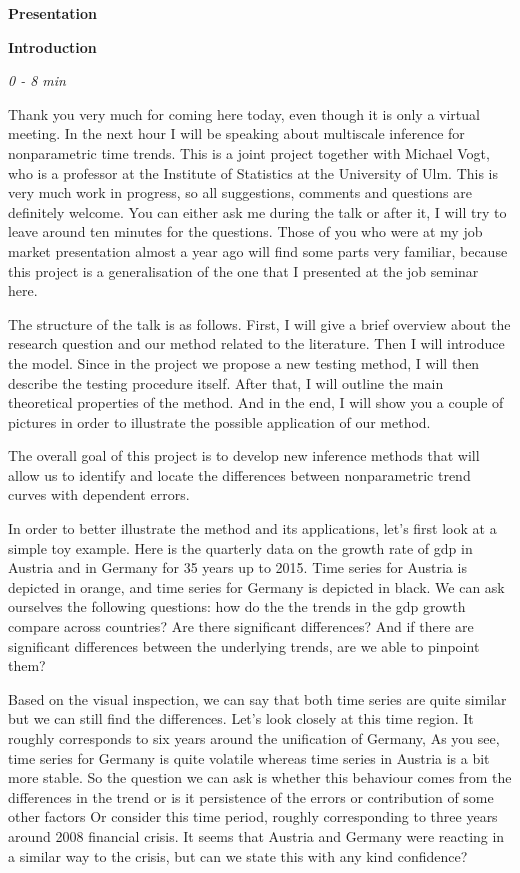 \documentclass[a4paper,12pt]{article}
\begin{document}
\begin{center}
\Large{\textbf{Presentation}}
\end{center}
\textbf{Introduction}

\emph{0 - 8 min}

Thank you very much for coming here today, even though it is only a virtual meeting. In the next hour I will be speaking about multiscale inference for nonparametric time trends. This is a joint project together with Michael Vogt, who is a professor at the Institute of Statistics at the University of Ulm. This is very much work in progress, so all suggestions, comments and questions are definitely welcome. You can either ask me during the talk or after it, I will try to leave around ten minutes for the questions. Those of you who were at my job market presentation almost a year ago will find some parts very familiar, because this project is a generalisation of the one that I presented at the job seminar here.

The structure of the talk is as follows. First, I will give a brief overview about the research question and our method related to the literature. Then I will introduce the model. Since in the project we propose a new testing method, I will then describe the testing procedure itself. After that, I will outline the main theoretical properties of the method. And in the end, I will show you a couple of pictures in order to illustrate the possible application of our method.

The overall goal of this project is to develop new inference methods that will allow us to identify and locate the differences between nonparametric trend curves with dependent errors. 

In order to better illustrate the method and its applications, let's first look at a simple toy example. Here is the quarterly data on the growth rate of gdp in Austria and in Germany for 35 years up to 2015. Time series for Austria is depicted in orange, and time series for Germany is depicted in black. We can ask ourselves the following questions: how do the the trends in the gdp growth compare across countries? Are there significant differences? And if there are significant differences between the underlying trends, are we able to pinpoint them?

Based on the visual inspection, we can say that both time series are quite similar but we can still find the differences. Let's look closely at this time region. It roughly corresponds to six years around the unification of Germany, As you see, time series for Germany is quite volatile whereas time series in Austria is a bit more stable. So the question we can ask is whether this behaviour comes from the differences in the trend or is it persistence of the errors or contribution of some other factors Or consider this time period, roughly corresponding to three years around 2008 financial crisis. It seems that Austria and Germany were reacting in a similar way to the crisis, but can we state this with any kind confidence?
\end{document}
